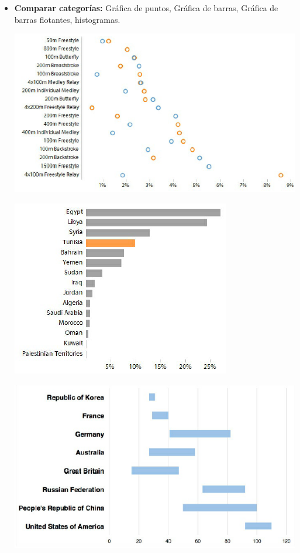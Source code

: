 \begin{itemize}
    \item\textbf{Comparar categorías:} Gráfica de puntos, Gráfica de barras, Gráfica de barras flotantes, histogramas.
    \begin{center}
        \bigbreak
        \includegraphics[scale=0.5]{images/marco_teorico/puntos_chart.png}
        \label{fig:marco_teorico_puntos_chart}
        \bigbreak
        
        \includegraphics[scale=0.75]{images/marco_teorico/barra_chart.png}
        \label{fig:marco_teorico_barra_chart}
        \bigbreak
    
        \includegraphics[scale=0.45]{images/marco_teorico/barra_flotante_chart.png}
        \label{fig:marco_teorico_barra_flotante_chart}
        \bigbreak
        

\end{center}
\end{itemize}
